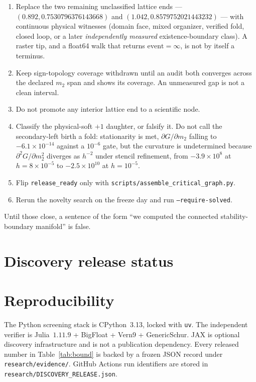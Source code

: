\documentclass[11pt]{article}
\begin{document}
\begin{enumerate}
\item Replace the two remaining unclassified lattice ends ---
$(0.892,0.7530796376143668)$ and $(1.042,0.8579752021443232)$ --- with
continuous physical witnesses (domain face, mixed organizer, verified fold,
closed loop, or a later \emph{independently measured} existence-boundary
class).  A raster tip, and a float64 walk that returns
$\mathrm{event}=\infty$, is not by itself a terminus.
\item Keep sign-topology coverage withdrawn until an audit both converges
across the declared $m_2$ span and shows its coverage.  An unmeasured gap
is not a clean interval.
\item Do not promote any interior lattice end to a scientific node.
\item Classify the physical-soft $+1$ daughter, or falsify it.  Do not call
the secondary-left birth a fold: stationarity is met, $\partial G/\partial m_2$ falling to
$-6.1\times10^{-14}$ against a $10^{-6}$ gate, but the curvature is undetermined because
$\partial^2G/\partial m_2^2$ diverges as $h^{-2}$ under stencil refinement, from
$-3.9\times10^{8}$ at $h=8\times10^{-5}$ to $-2.5\times10^{10}$ at $h=10^{-5}$.
\item Flip \texttt{release\_ready} only with
\texttt{scripts/assemble\_critical\_graph.py}.
\item Rerun the novelty search on the freeze day and run
\texttt{--require-solved}.
\end{enumerate}
Until those close, a sentence of the form ``we computed the connected
stability-boundary manifold'' is false.

\section{Discovery release status}

\section{Reproducibility}

The Python screening stack is CPython~3.13, locked with \texttt{uv}.
The independent verifier is Julia~$1.11.9$ + BigFloat + Vern9 + GenericSchur.
JAX is optional discovery infrastructure and is not a publication dependency.
Every released number in Table~\ref{tab:bound} is backed by a frozen JSON
record under \texttt{research/evidence/}.
GitHub Actions run identifiers are stored in
\texttt{research/DISCOVERY\_RELEASE.json}.



\end{document}
